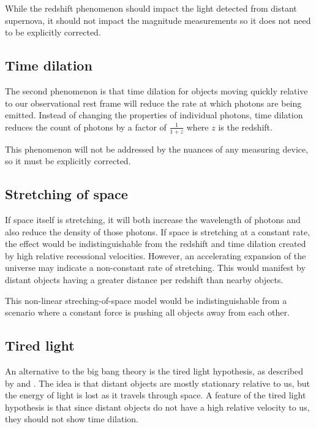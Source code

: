 \documentclass{article}
\begin{document}
While the redshift phenomenon should impact the light detected from distant
supernova, it should not impact the magnitude measurements so it does not need
to be explicitly corrected.

\subsection{Time dilation}

The second phenomenon is that time dilation for objects moving quickly relative
to our observational rest frame will reduce the rate at which photons are being
emitted. Instead of changing the properties of individual photons, time
dilation reduces the count of photons by a factor of $\frac{1}{1+z}$ where $z$
is the redshift.

This phenomenon will not be addressed by the nuances of any measuring device,
so it must be explicitly corrected.

\subsection{Stretching of space}

If space itself is stretching, it will both increase the wavelength of photons
and also reduce the density of those photons. If space is stretching at a
constant rate, the effect would be indistinguishable from the redshift and time
dilation created by high relative recessional velocities. However, an
accelerating expansion of the universe may indicate a non-constant rate of
stretching. This would manifest by distant objects having a greater distance
per redshift than nearby objects.

This non-linear streching-of-space model would be indistinguishable from a
scenario where a constant force is pushing all objects away from each other.

\subsection{Tired light}

An alternative to the big bang theory is the tired light hypothesis, as
described by \citet{zwicky1929} and \citet{shao2013}. The idea is that distant
objects are mostly stationary relative to us, but the energy of light is lost
as it travels through space. A feature of the tired light hypothesis is that
since distant objects do not have a high relative velocity to us, they should
not show time dilation.
\end{document}
